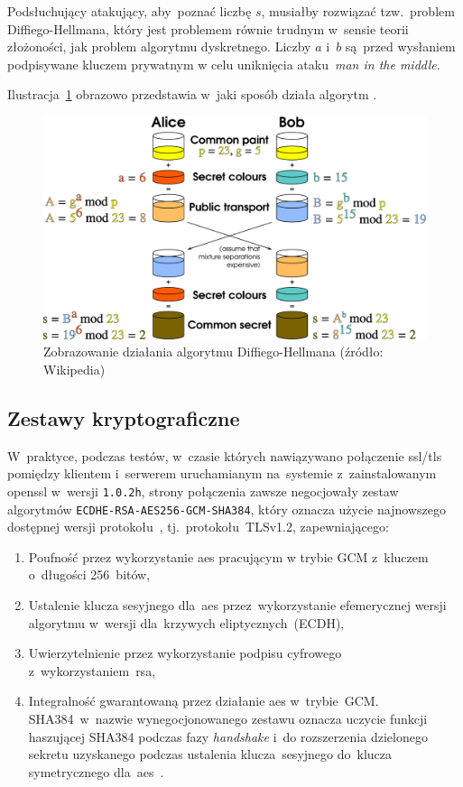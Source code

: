 \documentclass[thesis]{subfiles}
\begin{document}
Podsłuchujący atakujący, aby~poznać liczbę $s$, musiałby rozwiązać tzw.~problem Diffiego-Hellmana, który jest problemem równie trudnym w~sensie teorii złożoności, jak problem algorytmu dyskretnego. Liczby $a$ i~$b$ są~przed wysłaniem podpisywane kluczem prywatnym w celu uniknięcia ataku~\emph{man in the middle}.

Ilustracja~\ref{fig:dh} obrazowo przedstawia w~jaki sposób działa algorytm .

\begin{figure}[hb]
	\centering
	\includegraphics[width=\textwidth]{img/Diffie-Hellman_Key_Exchange_desc}
	\caption{Zobrazowanie działania algorytmu Diffiego-Hellmana (źródło: Wikipedia)}
	\label{fig:dh}
\end{figure}


\subsection{Zestawy kryptograficzne}

W~praktyce, podczas testów, w~czasie których nawiązywano połączenie \gls{ssl/tls} pomiędzy klientem i~serwerem uruchamianym na~systemie z~zainstalowanym \gls{openssl} w~wersji \texttt{1.0.2h}, strony połączenia zawsze negocjowały zestaw algorytmów \texttt{ECDHE-RSA-AES256-GCM-SHA384}, który oznacza użycie najnowszego dostępnej wersji protokołu~, tj.~protokołu~TLSv1.2, zapewniającego:
\begin{enumerate}
\item Poufność przez wykorzystanie \gls{aes} pracującym w trybie GCM z~kluczem o~długości 256~bitów,
\item Ustalenie klucza sesyjnego dla~\gls{aes} przez~wykorzystanie efemerycznej wersji algorytmu  w~wersji dla~krzywych eliptycznych~(ECDH),
\item Uwierzytelnienie przez wykorzystanie podpisu cyfrowego z~wykorzystaniem~\gls{rsa},
\item Integralność gwarantowaną przez działanie \gls{aes} w~trybie~GCM. SHA384~w~nazwie wynegocjonowanego zestawu oznacza uczycie funkcji haszującej SHA384 podczas fazy \emph{handshake} i~do rozszerzenia dzielonego sekretu uzyskanego podczas ustalenia klucza~sesyjnego do~klucza symetrycznego dla~\gls{aes}~\cite{stack:openssl-sha-gcm}.
\end{enumerate}
\end{document}
